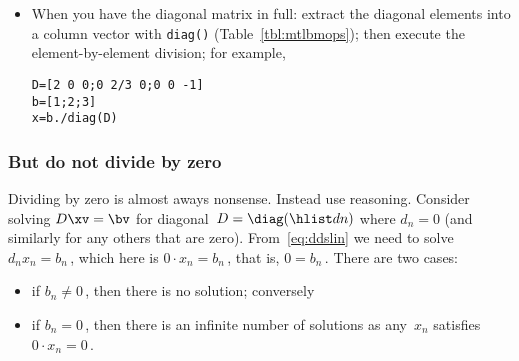 \begin{compute}
\begin{itemize}
\item When you have the diagonal matrix in full:  extract the diagonal elements into a column vector with \verb|diag()| (Table~\ref{tbl:mtlbmops});  then execute the element-by-element division; for example,
\setbox\ajrqrbox\hbox{}%
\marginpar{\usebox{\ajrqrbox\\[2ex]}}%
\begin{verbatim}
D=[2 0 0;0 2/3 0;0 0 -1]
b=[1;2;3]
x=b./diag(D)
\end{verbatim}
\end{itemize}

\end{compute}


\subsubsection{But do not divide by zero} 
Dividing by zero is almost aways nonsense.
Instead use reasoning.
Consider solving \(D\xv=\bv\) for diagonal~\(D=\diag(\hlist dn)\) where \(d_n=0\) (and similarly for any others that are zero).
From~\eqref{eq:ddslin} we need to solve \(d_nx_n=b_n\)\,, which here is \(0\cdot x_n=b_n\)\,, that is, \(0=b_n\)\,. 
There are two cases: 
\begin{itemize}
\item if \(b_n\neq 0\)\,, then there is no solution; conversely
\item if \(b_n=0\)\,, then there is an infinite number of solutions as any~\(x_n\) satisfies \(0\cdot x_n=0\)\,.
\end{itemize}





